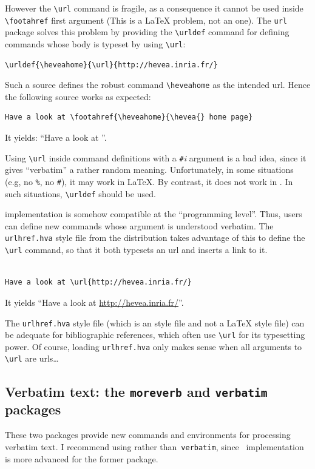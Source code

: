 However the \verb+\url+ command is fragile, as a consequence it
cannot be used inside \verb+\footahref+ first argument (This is a
\LaTeX{} problem, not an \hevea{} one).
The \texttt{url} package solves this problem by providing the
\verb+\urldef+ command
for defining commands whose body is typeset by using \verb+\url+:
\begin{verbatim}
\urldef{\heveahome}{\url}{http://hevea.inria.fr/}
\end{verbatim}
%
Such a source defines the robust command \verb+\heveahome+ as the
intended url.
Hence the following source works as expected:
\begin{verbatim}
Have a look at \footahref{\heveahome}{\hevea{} home page}
\end{verbatim}
It yields: ``Have a look at ''.

Using \verb+\url+ inside command definitions with a
\verb+#+\textit{i} argument is a bad idea, since
it gives ``verbatim'' a rather random meaning.
Unfortunately, in some situations (e.g, no \verb+%+, no \verb+#+),
it may work in \LaTeX{}. By
contrast, it does not work in \hevea{}. In such situations,
\verb+\urldef+ should be used.

\hevea{} implementation is somehow compatible at the ``programming level''.
Thus, users can define new commands whose argument is understood
verbatim. The \texttt{urlhref.hva} style file
from the distribution
takes advantage of this to define the \verb+\url+ command, so that it both
typesets an url and inserts a link to it.
\begin{htmlonly}
\begin{verbatim}

Have a look at \url{http://hevea.inria.fr/}
\end{verbatim}
It yields ``Have a look at \url{http://hevea.inria.fr/}''.
\end{htmlonly}
The \texttt{urlhref.hva}
style file (which is an \hevea{} style file and not a \LaTeX{}
style file) can be adequate for bibliographic references,
which often use \verb+\url+ for its typesetting power.
Of course, loading \texttt{urlhref.hva} only makes sense when
all arguments to \verb+\url+ are urls\ldots

\subsection{Verbatim text: the \texttt{moreverb} and
\texttt{verbatim} packages}
These two packages provide new commands and environments for
processing verbatim text.
I recommend using
rather than~\texttt{verbatim},
since \hevea~implementation is more advanced for the former package.




